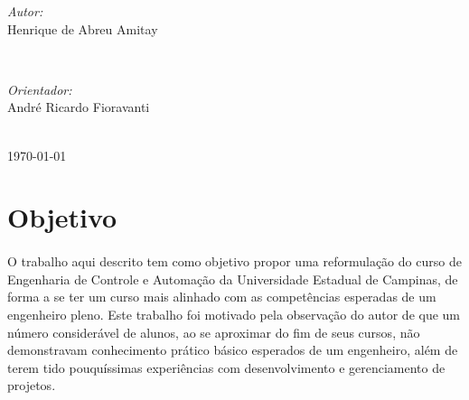 \documentclass[12pt]{article} %
\begin{document}
\begin{titlepage}
\begin{minipage}{0.4\textwidth}
\begin{flushleft} \large
\emph{Autor:}\\
Henrique de Abreu {Amitay} %
\end{flushleft}
\end{minipage}
~
\begin{minipage}{0.4\textwidth}
\begin{flushleft} \large
\emph{Orientador:} \\
André Ricardo Fioravanti %
\end{flushleft}
\end{minipage}\\[4cm]

{\today}\\[3cm] %


\vfill %

\end{titlepage}

\tableofcontents
\pagebreak


\section{Objetivo}

\paragraph{}O trabalho aqui descrito tem como objetivo propor uma reformulação do curso de Engenharia de Controle e Automação da Universidade Estadual de Campinas, de forma a se ter um curso mais alinhado com as competências esperadas de um engenheiro pleno. Este trabalho foi motivado pela observação do autor de que um número considerável de alunos, ao se aproximar do fim de seus cursos, não demonstravam conhecimento prático básico esperados de um engenheiro, além de terem tido pouquíssimas experiências com desenvolvimento e gerenciamento de projetos.
\end{document}
